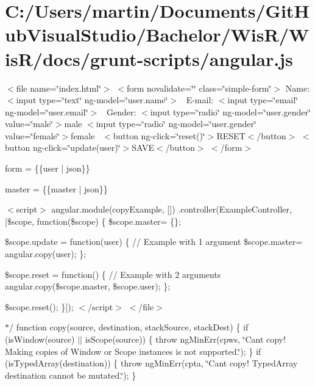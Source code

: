 \hypertarget{_c_1_2_users_2martin_2_documents_2_git_hub_visual_studio_2_bachelor_2_wis_r_2_wis_r_2docs_2grunt-scripts_2angular_8js-example}{}\section{C\+:/\+Users/martin/\+Documents/\+Git\+Hub\+Visual\+Studio/\+Bachelor/\+Wis\+R/\+Wis\+R/docs/grunt-\/scripts/angular.\+js}
$<$file name=\char`\"{}index.\+html\char`\"{}$>$  $<$form novalidate=\char`\"{}\char`\"{} class=\char`\"{}simple-\/form\char`\"{}$>$ Name\+: $<$input type=\char`\"{}text\char`\"{} ng-\/model=\char`\"{}user.\+name\char`\"{}$>$~\newline
 E-\/mail\+: $<$input type=\char`\"{}email\char`\"{} ng-\/model=\char`\"{}user.\+email\char`\"{}$>$~\newline
 Gender\+: $<$input type=\char`\"{}radio\char`\"{} ng-\/model=\char`\"{}user.\+gender\char`\"{} value=\char`\"{}male\char`\"{}$>$male $<$input type=\char`\"{}radio\char`\"{} ng-\/model=\char`\"{}user.\+gender\char`\"{} value=\char`\"{}female\char`\"{}$>$female~\newline
 $<$button ng-\/click=\char`\"{}reset()\char`\"{}$>$R\+E\+S\+E\+T$<$/button$>$ $<$button ng-\/click=\char`\"{}update(user)\char`\"{}$>$S\+A\+V\+E$<$/button$>$ $<$/form$>$ 
\begin{DoxyPre}form = \{\{user | json\}\}\end{DoxyPre}
 
\begin{DoxyPre}master = \{\{master | json\}\}\end{DoxyPre}
 

$<$script$>$ angular.\+module(\textquotesingle{}copy\+Example\textquotesingle{}, \mbox{[}\mbox{]}) .controller(\textquotesingle{}Example\+Controller\textquotesingle{}, \mbox{[}\textquotesingle{}\$scope\textquotesingle{}, function(\$scope) \{ \$scope.\+master= \{\};

\$scope.\+update = function(user) \{ // Example with 1 argument \$scope.\+master= angular.\+copy(user); \};

\$scope.\+reset = function() \{ // Example with 2 arguments angular.\+copy(\$scope.\+master, \$scope.\+user); \};

\$scope.\+reset(); \}\mbox{]}); $<$/script$>$ $<$/file$>$ 

$\ast$/ function copy(source, destination, stack\+Source, stack\+Dest) \{ if (is\+Window(source) $\vert$$\vert$ is\+Scope(source)) \{ throw ng\+Min\+Err(\textquotesingle{}cpws\textquotesingle{}, \char`\"{}\+Can\textquotesingle{}t copy! Making copies of Window or Scope instances is not supported.\char`\"{}); \} if (is\+Typed\+Array(destination)) \{ throw ng\+Min\+Err(\textquotesingle{}cpta\textquotesingle{}, \char`\"{}\+Can\textquotesingle{}t copy! Typed\+Array destination cannot be mutated.\char`\"{}); \}

